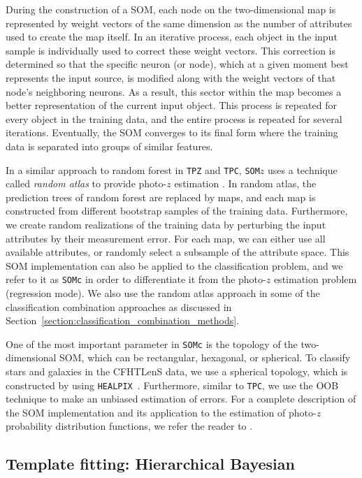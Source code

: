 \documentclass[useAMS,usenatbib]{mn2e}
\begin{document}
During the construction of a SOM,
each node on the two-dimensional map is represented by
weight vectors of the same dimension
as the number of attributes used to create the map itself.
In an iterative process,
each object in the input sample is individually used
to correct these weight vectors.
This correction is determined so that the specific neuron (or node),
which at a given moment best represents the input source,
is modified along with the weight vectors
of that node's neighboring neurons.
As a result, this sector within the map
becomes a better representation of the current input object.
This process is repeated for every object in the training data,
and the entire process is repeated for several iterations.
Eventually, the SOM converges to its final form where
the training data is separated into groups of similar features.

In a similar approach to random forest in \texttt{TPZ} and \texttt{TPC},
\texttt{SOM}$z$ uses a technique called \textit{random atlas}
to provide photo-$z$ estimation \citep{carrascokind2014somz}.
In random atlas, the prediction trees of random forest are replaced by maps,
and each map is constructed from different bootstrap samples
of the training data.
Furthermore, we create random realizations of the training data
by perturbing the input attributes by their measurement error.
For each map, we can either use all available attributes,
or randomly select a subsample of the attribute space.
This SOM implementation can also be
applied to the classification problem,
and we refer to it as \texttt{SOMc}
in order to differentiate it from 
the photo-$z$ estimation problem (regression mode).
We also use the random atlas approach
in some of the classification combination approaches as discussed in
Section~\ref{section:classification_combination_methods}.

One of the most important parameter in \texttt{SOMc}
is the topology of the two-dimensional SOM,
which can be rectangular, hexagonal, or spherical.
To classify stars and galaxies in the CFHTLenS data,
we use a spherical topology,
which is constructed by using
\texttt{HEALPIX}~\citep{gorski2005healpix}.
Furthermore, similar to \texttt{TPC},
we use the OOB technique to make an unbiased estimation of errors.
For a complete description of the SOM implementation
and its application to the estimation of
photo-$z$ probability distribution functions,
we refer the reader to \cite{carrascokind2014somz}.

\subsection{Template fitting: Hierarchical Bayesian}
\end{document}
